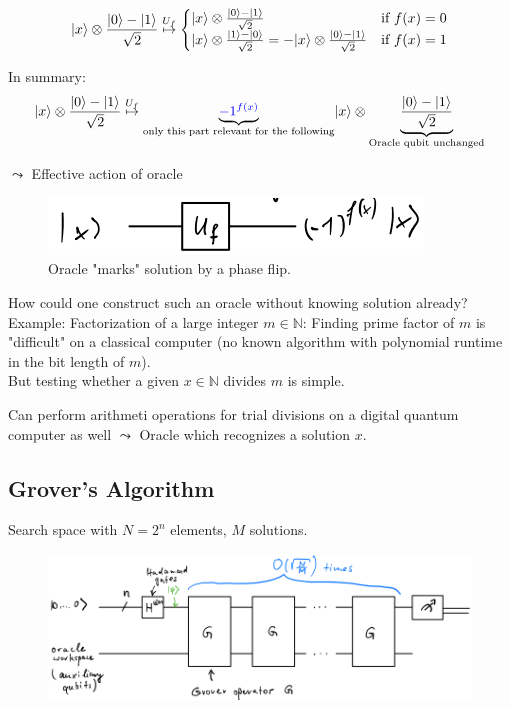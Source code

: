 \begin{equation}
    \lvert x\rangle \otimes \frac{\lvert0\rangle - \lvert1\rangle}{\sqrt{2}}
    \stackrel{U_f}{\mapsto}
    \begin{cases}
        \lvert x\rangle \otimes \frac{\lvert0\rangle - \lvert1\rangle}{\sqrt{2}} & \text{if } f(x) = 0\\
        \lvert x\rangle \otimes \frac{\lvert1\rangle - \lvert0\rangle}{\sqrt{2}} = 
            - \lvert x\rangle \otimes \frac{\lvert0\rangle - \lvert1\rangle}{\sqrt{2}} & \text{if } f(x) = 1
    \end{cases}
\end{equation}

In summary: 
\begin{equation}
    \lvert x\rangle \otimes \frac{\lvert0\rangle - \lvert1\rangle}{\sqrt{2}}
    \stackrel{U_f}{\mapsto}
    \underbrace{{\color{blue}-1^{f(x)}}}_{\text{only this part relevant for the following}}
        \lvert x\rangle \otimes \underbrace{\frac{\lvert0\rangle - \lvert1\rangle}{\sqrt{2}}}_{\text{Oracle qubit unchanged}}
\end{equation}

$\leadsto$ Effective action of oracle

\begin{figure}[H]
    \centering
    \includegraphics[scale=0.5]{chapters/res/effective-action-oracle.png}
    \caption{Oracle "marks" solution by a phase flip.}
\end{figure}


How could one construct such an oracle without knowing solution already? \\
Example: Factorization of a large integer $m \in \mathbb{N}$:
Finding prime factor of $m$ is "difficult" on a classical computer (no known algorithm with
polynomial runtime in the bit length of $m$). \\
But testing whether a given $x \in \mathbb{N}$ divides $m$ is simple.

Can perform arithmeti operations for trial divisions on a digital quantum computer as well
$\leadsto$ Oracle which recognizes a solution $x$.

\subsection{Grover's Algorithm}
Search space with $N = 2^n$ elements, $M$ solutions. 

\begin{figure}[H]
    \centering
    \includegraphics[scale=0.4]{chapters/res/groovers-algorithm.png}
\end{figure}


